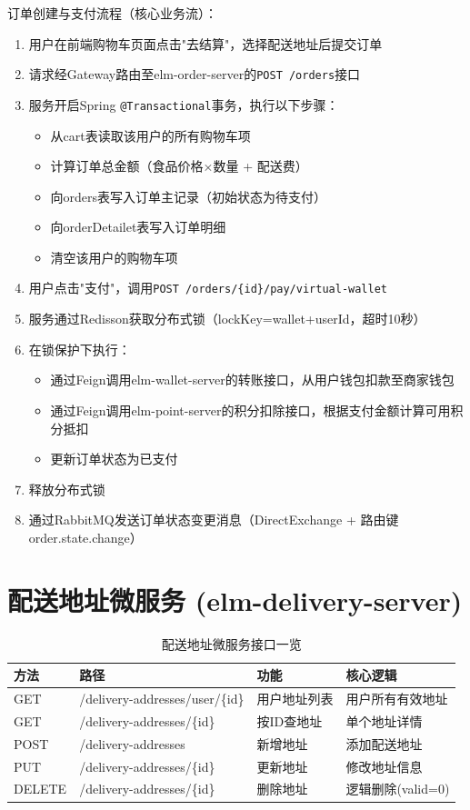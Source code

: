订单创建与支付流程（核心业务流）：
\begin{enumerate}
	\item 用户在前端购物车页面点击"去结算"，选择配送地址后提交订单
	\item 请求经Gateway路由至elm-order-server的\verb|POST /orders|接口
	\item 服务开启Spring \verb|@Transactional|事务，执行以下步骤：
	\begin{itemize}
		\item 从cart表读取该用户的所有购物车项
		\item 计算订单总金额（食品价格×数量 + 配送费）
		\item 向orders表写入订单主记录（初始状态为待支付）
		\item 向orderDetailet表写入订单明细
		\item 清空该用户的购物车项
	\end{itemize}
	\item 用户点击"支付"，调用\verb|POST /orders/{id}/pay/virtual-wallet|
	\item 服务通过Redisson获取分布式锁（lockKey=wallet+userId，超时10秒）
	\item 在锁保护下执行：
	\begin{itemize}
		\item 通过Feign调用elm-wallet-server的转账接口，从用户钱包扣款至商家钱包
		\item 通过Feign调用elm-point-server的积分扣除接口，根据支付金额计算可用积分抵扣
		\item 更新订单状态为已支付
	\end{itemize}
	\item 释放分布式锁
	\item 通过RabbitMQ发送订单状态变更消息（DirectExchange + 路由键order.state.change）
\end{enumerate}

\section{配送地址微服务 (elm-delivery-server)}

\begin{longtable}{p{1.5cm}p{2.8cm}p{4.0cm}p{5.2cm}}
	\caption{配送地址微服务接口一览}\\
	\hline
	\textbf{方法} & \textbf{路径} & \textbf{功能} & \textbf{核心逻辑} \\
	\hline
	\endfirsthead
	GET & /delivery-addresses/user/\{id\} & 用户地址列表 & 用户所有有效地址 \\
	GET & /delivery-addresses/\{id\} & 按ID查地址 & 单个地址详情 \\
	POST & /delivery-addresses & 新增地址 & 添加配送地址 \\
	PUT & /delivery-addresses/\{id\} & 更新地址 & 修改地址信息 \\
	DELETE & /delivery-addresses/\{id\} & 删除地址 & 逻辑删除(valid=0) \\
	\hline
\end{longtable}

